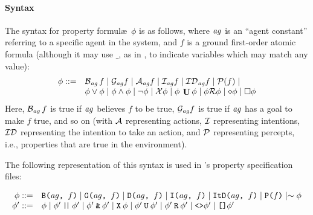 \paragraph{Syntax}
The syntax for property formul\ae\ $\phi$ is as follows, where
$\mathit{ag}$ is an ``agent constant'' referring to a specific agent in
the system, and $f$ is a ground first-order atomic formula (although it may use $\_$, as in \prolog, to indicate variables which may match any value):
%
\begin{equation*}
\begin{array}{rl}
\phi ::= & \mathrm{{\cal B}}_{\mathit{ag}} \, f \mid \mathrm{{\cal G}}_{\mathit{ag}} f \mid
  \mathrm{{\cal A}}_{\mathit{ag}} f \mid \mathrm{{\cal I}}_{\mathit{ag}} f \mid
  \mathrm{{\cal ID}}_{\mathit{ag}} f \mid
  \mathrm{{\cal P}}(f) \mid \\ &
  \phi \vee \phi \mid \phi \wedge \phi \mid \neg \phi
   \mid \mathcal{X} \phi \mid \phi \: \mathop{\mathrm{\mathbf{U}}} \phi \mid \phi \mathcal{R} \phi \mid \diamond \phi \mid \Box \phi
\end{array}
\end{equation*}
%
Here, $\mathrm{{\cal B}}_{\mathit{ag}} \, f$\index{$\lbeliefop$} is true if $\mathit{ag}$ believes
$f$ to be true, $\mathrm{{\cal G}}_{\mathit{ag}} f$\index{$\lgoalop$} is true if $\mathit{ag}$ has a
goal to make $f$ true, and so on (with $\lactionsfunc$\index{$\lactionsfunc$} representing
actions, $\lintentionfunc$\index{$\lintentionfunc$} representing intentions, $\lintendtodofunc$\index{$\lintendtodofunc$} representing the intention to take an action, and $\lperceptfunc$\index{$\lperceptfunc$}
representing percepts, i.e., properties that are true in the environment).

The following representation of this syntax is used in \ajpf's property specification files:

\begin{equation*}
\begin{array}{rl}
\phi ::= & \texttt{B(}\mathit{ag}\texttt{, }f\texttt{)} \mid 
\texttt{G(}\mathit{ag}\texttt{, }f\texttt{)} \mid 
\texttt{D(}\mathit{ag}\texttt{, }f\texttt{)} \mid 
\texttt{I(}\mathit{ag}\texttt{, }f\texttt{)} \mid 
\texttt{ItD(}\mathit{ag}\texttt{, }f\texttt{)} \mid 
\texttt{P(}f\texttt{)} \mid \sim \phi \\
\phi' ::= & \phi \mid 
  \phi' \: \texttt{|\!|} \: \phi' \mid 
  \phi' \: \texttt{\&} \: \phi' \mid 
  \texttt{X} \: \phi \mid
   \phi' \: \texttt{U} \: \phi' \mid \phi' \: \texttt{R} \: \phi' \mid \texttt{<>} \phi' \mid \texttt{[]} \phi'
\end{array}
\end{equation*}

